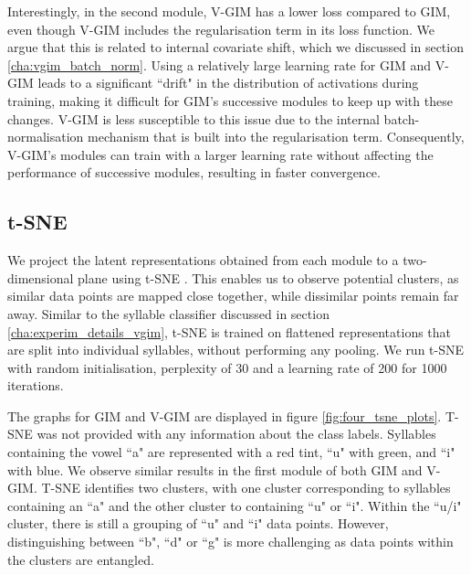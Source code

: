 		Interestingly, in the second module, V-GIM has a lower loss compared to GIM, even though V-GIM includes the regularisation term in its loss function. We argue that this is related to internal covariate shift, which we discussed in section \ref{cha:vgim_batch_norm}. Using a relatively large learning rate for GIM and V-GIM leads to a significant ``drift" in the distribution of activations during training, making it difficult for GIM's successive modules to keep up with these changes. V-GIM is less susceptible to this issue due to the internal batch-normalisation mechanism that is built into the regularisation term. Consequently, V-GIM's modules can train with a larger learning rate without affecting the performance of successive modules, resulting in faster convergence. %
		
		
		  



		
	\subsection{t-SNE} %
	We project the latent representations obtained from each module to a two-dimensional plane using t-SNE \citep{maatenVisualizingDataUsing2008}. This enables us to observe potential clusters, as similar data points are mapped close together, while dissimilar points remain far away. Similar to the syllable classifier discussed in section \ref{cha:experim_details_vgim}, t-SNE is trained on flattened representations that are split into individual syllables, without performing any pooling. We run t-SNE with random initialisation, perplexity of 30 and a learning rate of 200 for 1000 iterations.
	
	The graphs for GIM and V-GIM are displayed in figure \ref{fig:four_tsne_plots}. T-SNE was not provided with any information about the class labels. Syllables containing the vowel ``a" are represented with a red tint, ``u" with green, and ``i" with blue. We observe similar results in the first module of both GIM and V-GIM. T-SNE identifies two clusters, with one cluster corresponding to syllables containing an ``a" and the other cluster to containing ``u" or ``i". Within the ``u/i" cluster, there is still a grouping of ``u" and ``i" data points. However, distinguishing between ``b", ``d" or ``g" is more challenging as data points within the clusters are entangled.
	
